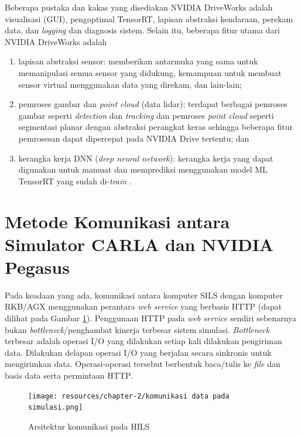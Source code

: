 Beberapa pustaka dan kakas yang disediakan NVIDIA DriveWorks adalah visualisasi
(GUI), pengoptimal TensorRT, lapisan abstraksi kendaraan, perekam data, dan
\textit{logging} dan diagnosis sistem. Selain itu, beberapa fitur utama dari
NVIDIA DriveWorks adalah
\begin{enumerate}
	\item lapisan abstraksi sensor: memberikan antarmuka yang sama untuk
	      memanipulasi semua sensor yang didukung, kemampuan untuk membuat sensor
	      virtual menggunakan data yang direkam, dan lain-lain;
	\item pemroses gambar dan \textit{point cloud} (data lidar): terdapat
	      berbagai pemroses gambar seperti \textit{detection} dan
	      \textit{tracking} dan pemroses \textit{point cloud} seperti segmentasi
	      planar dengan abstraksi perangkat keras sehingga beberapa fitur
	      pemrosesan dapat dipercepat pada NVIDIA Drive tertentu; dan
	\item kerangka kerja DNN (\textit{deep neural network}): kerangka kerja yang
	      dapat digunakan untuk mamuat dan memprediksi menggunakan model ML
	      TensorRT yang sudah di-\textit{train}
	      \parencite{nvidia_driveworksSdkGettingStarted}.
\end{enumerate}

\section{Metode Komunikasi antara Simulator CARLA dan NVIDIA
  Pegasus}\label{chapter-2-section-comms}

Pada keadaan yang ada, komunikasi antara komputer SILS dengan komputer RKB/AGX
menggunakan perantara \textit{web service} yang berbasis HTTP (dapat dilihat
pada Gambar \ref{chapter-2-old-hils}). Penggunaan HTTP pada \textit{web service}
sendiri sebenarnya bukan \textit{bottleneck}/penghambat kinerja terbesar sistem
simulasi. \textit{Bottleneck} terbesar adalah operasi I/O yang dilakukan setiap
kali dilakukan pengiriman data. Dilakukan delapan operasi I/O yang berjalan
secara sinkronis untuk mengirimkan data. Operasi-operasi tersebut berbentuk
baca/tulis ke \textit{file} dan basis data serta permintaan HTTP.

\begin{figure}[!htbp]
	\centering
	\texttt{[image: resources/chapter-2/komunikasi
		data pada simulasi.png]}
	\caption{Arsitektur komunikasi pada HILS \parencite{trilaksono_laporanRispro}}
	\label{chapter-2-old-hils}
\end{figure}

